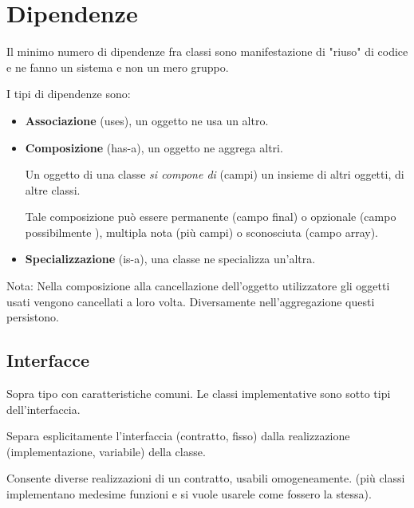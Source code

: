 \section{Dipendenze}
Il minimo numero di dipendenze fra classi sono manifestazione di "riuso" di codice e ne fanno un sistema e non un mero gruppo.

I tipi di dipendenze sono:
\begin{itemize}
	\item \textbf{Associazione} (uses),  un oggetto ne usa un altro.
	\item \textbf{Composizione} (has-a), un oggetto ne aggrega altri.

	Un oggetto di una classe \textit{si compone di} (campi) un insieme di altri oggetti, di altre classi.

	Tale composizione può essere permanente (campo final) o opzionale (campo possibilmente ), multipla nota (più campi) o sconosciuta (campo array).
	\item \textbf{Specializzazione} (is-a), una classe ne specializza un'altra.
\end{itemize}

Nota: Nella composizione alla cancellazione dell'oggetto utilizzatore gli oggetti usati vengono cancellati a loro volta. Diversamente nell'aggregazione questi persistono.

\subsection{Interfacce}
Sopra tipo con caratteristiche comuni. Le classi implementative sono sotto tipi dell'interfaccia.

\bigskip

Separa esplicitamente l'interfaccia (contratto, fisso) dalla realizzazione (implementazione, variabile) della classe.

Consente diverse realizzazioni di un contratto, usabili omogeneamente. (più classi implementano medesime funzioni e si vuole usarele come fossero la stessa).


